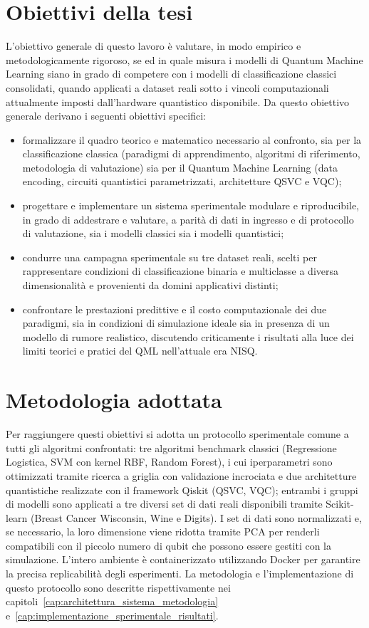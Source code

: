 \section*{Obiettivi della tesi}

L'obiettivo generale di questo lavoro è valutare, in modo empirico e metodologicamente rigoroso, se ed in quale misura i modelli di Quantum Machine Learning siano in grado di competere con i modelli di classificazione classici consolidati, quando applicati a dataset reali sotto i vincoli computazionali attualmente imposti dall'hardware quantistico disponibile. Da questo obiettivo generale derivano i seguenti obiettivi specifici:

\begin{itemize}
    \item formalizzare il quadro teorico e matematico necessario al confronto, sia per la classificazione classica (paradigmi di apprendimento, algoritmi di riferimento, metodologia di valutazione) sia per il Quantum Machine Learning (data encoding, circuiti quantistici parametrizzati, architetture QSVC e VQC);
    \item progettare e implementare un sistema sperimentale modulare e riproducibile, in grado di addestrare e valutare, a parità di dati in ingresso e di protocollo di valutazione, sia i modelli classici sia i modelli quantistici;
    \item condurre una campagna sperimentale su tre dataset reali, scelti per rappresentare condizioni di classificazione binaria e multiclasse a diversa dimensionalità e provenienti da domini applicativi distinti;
    \item confrontare le prestazioni predittive e il costo computazionale dei due paradigmi, sia in condizioni di simulazione ideale sia in presenza di un modello di rumore realistico, discutendo criticamente i risultati alla luce dei limiti teorici e pratici del QML nell'attuale era NISQ.
\end{itemize}

\section*{Metodologia adottata}

Per raggiungere questi obiettivi si adotta un protocollo sperimentale comune a tutti gli algoritmi confrontati: tre algoritmi benchmark classici (Regressione Logistica, SVM con kernel RBF, Random Forest), i cui iperparametri sono ottimizzati tramite ricerca a griglia con validazione incrociata e due architetture quantistiche realizzate con il framework Qiskit (QSVC, VQC); entrambi i gruppi di modelli sono applicati a tre diversi set di dati reali disponibili tramite Scikit-learn (Breast Cancer Wisconsin, Wine e Digits).
I set di dati sono normalizzati e, se necessario, la loro dimensione viene ridotta tramite PCA per renderli compatibili con il piccolo numero di qubit che possono essere gestiti con la simulazione. L'intero ambiente è containerizzato utilizzando Docker per garantire la precisa replicabilità degli esperimenti. La metodologia e l'implementazione di questo protocollo sono descritte rispettivamente nei capitoli~\ref{cap:architettura_sistema_metodologia} e~\ref{cap:implementazione_sperimentale_risultati}.


